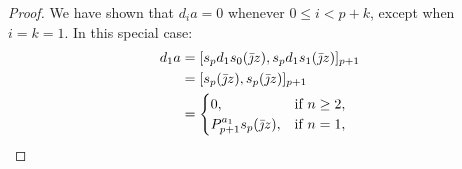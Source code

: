\documentclass[10pt]{article}
\newcommand{\LL}[1]{\ifblank{#1}{\scrK}{\scrK^{#1}}}
\newcommand{\nontop}[1]{\ifblank{#1}{\scrU}{\scrU^{#1}}}
\newcommand{\jmathbar}{\bar{\jmath}}
\newcommand{\Ind}[2][]{\ifblank{#1}{\mathbf{I}^{\smash{\mbox{\tiny $#2$}}}}{\mathbf{I}^{\mbox{\tiny $#2$}}_{#1}}}%
\newcommand{\BarConst}[1]{B^{\smash{\mbox{\tiny $#1$}}}}
\renewcommand{\Q}{Q}
\newcommand{\Shuffles}[2]{\textup{Sh}_{#1#2}}
\newcommand{\HalfShuffles}[2]{\textup{Sh}_{#1#2}/2}
\begin{document}
\begin{LieLambdaStructureOnKoszul}
\begin{proof}
We have shown that $d_ia=0$ whenever $0\leq i<p+k$, except when $i=k=1$. In this special case:
\begin{alignat*}{2}
d_1a
&=
[s_{p}d_1s_0(\jmathbar z), s_{p}d_1s_1(\jmathbar z)]_{p+1}%
\\
&=
[s_{p}(\jmathbar z), s_{p}(\jmathbar z)]_{p+1}%
\\
&=
\begin{cases}
0,&\textup{if }n\geq2,\\
P^{a_1}_{p+1}s_{p}(\jmathbar z),&\textup{if }n=1,
\end{cases}
\end{alignat*}
%
%
%
%
%
%

\end{proof}
\end{LieLambdaStructureOnKoszul}
\end{document}
